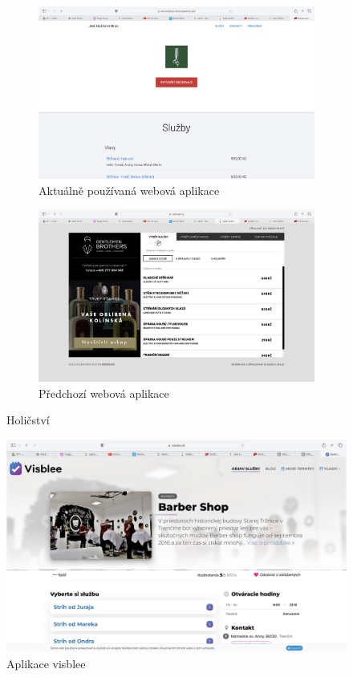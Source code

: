 \begin{figure}[h]
    \begin{subfigure}{.5\textwidth}
        \centering
        \includegraphics[width=.8\linewidth]{doc/latex/fig/vlado/rezervio_cz.png}
        \caption{Aktuálně používaná webová aplikace}
        \label{fig:current_aplication}
    \end{subfigure}
    \begin{subfigure}{.5\textwidth}
        \centering
        \includegraphics[width=.8\linewidth]{doc/latex/fig/vlado/rezerver_cz.png}
        \caption{Předchozí webová aplikace}
        \label{fig:previous_aplication}
    \end{subfigure}
    \caption{Holičství}
    \label{fig:barber}
    \centering
    \includegraphics[width=.4\linewidth]{doc/latex/fig/vlado/visblee_sk.png}
    \caption{Aplikace visblee}
    \label{fig:visblee}
\end{figure}
\newpage

